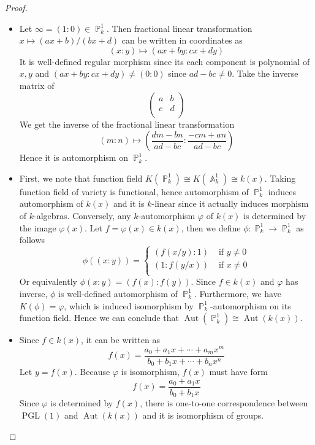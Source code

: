 \documentclass[12pt,a4paper]{article}
\theoremstyle{definition}
\DeclareMathOperator{\pgl}{PGL}
\DeclareMathOperator{\aut}{Aut}
\DeclareMathOperator{\p}{\mathbb{P}}
\DeclareMathOperator{\A}{\mathbb{A}}
\begin{document}
\begin{proof}
	\begin{itemize}
		\item Let $\infty=(1:0) \in \p_k^1$. Then fractional linear transformation $x \mapsto (ax+b)/(bx+d)$ can be written in coordinates as\[
		(x:y) \mapsto (ax+by:cx+dy)
		\]
		It is well-defined regular morphism since its each component is polynomial of $x,y$ and $(ax+by:cx+dy) \neq (0:0)$ since $ad-bc \neq 0$. Take the inverse matrix of
		\[
		\begin{pmatrix}
		a&b\\
		c&d\\
		\end{pmatrix}
		\]
		We get the inverse of the fractional linear transformation
		\[
		(m:n) \mapsto (\frac{dm-bn}{ad-bc}: \frac{-cm+an}{ad-bc})
		\]
		Hence it is automorphism on $\p_k^1$.
		\item First, we note that function field $K(\p_k^1) \cong K(\A_k^1) \cong k(x)$. Taking function field of variety is functional, hence automorphism of $\p_k^1$ induces automorphism of $k(x)$ and it is $k$-linear since it actually induces morphism of $k$-algebras. Conversely, any $k$-automorphism $\varphi$ of $k(x)$ is determined by the image $\varphi(x)$. Let $f= \varphi(x) \in k(x)$, then we define $\phi \colon \p_k^1 \to \p_k^1$ as follows 
		\[
		\phi((x:y)) = \begin{cases}
		(f(x/y):1)& \text{ if } y \neq 0\\
		(1:f(y/x))& \text{ if } x \neq 0\\
		\end{cases}
		\]
		Or equivalently $\phi(x:y) = (f(x): f(y))$. Since $f \in k(x)$ and $\varphi$ has inverse, $\phi$ is well-defined automorphism of $\p_k^1$. Furthermore, we have $K(\phi) = \varphi$, which is induced isomorphism by $\p_k^1$-automorphism on its function field. Hence we can conclude that $\aut(\p_k^1) \cong \aut(k(x))$.
		\item Since $f \in k(x)$, it can be written as
		\[
		f(x)= \frac{a_0 + a_1 x + \cdots + a_m x^m}{b_0 + b_1 x+ \cdots + b_n x^n}
		\]
		Let $y= f(x)$. Because $\varphi$ is isomorphism, $f(x)$ must have form
		\[
		f(x) = \frac{a_0 + a_1 x}{b_0 +b_1 x}
		\]
		Since $\varphi$ is determined by $f(x)$, there is one-to-one correspondence between $\pgl(1)$ and $\aut(k(x))$ and it is isomorphism of groups.
	\end{itemize}
\end{proof}
\newpage
\end{document}
